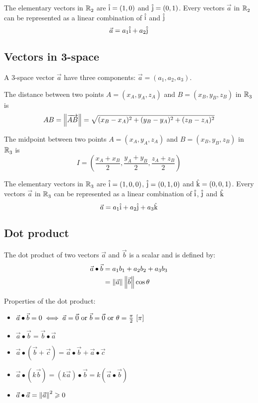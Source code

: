 \documentclass[10pt, twocolumn]{article}
\theoremstyle{remark}
\begin{document}
The elementary vectors in \(\mathbb{R}_{2}^{}\) are \(\hat{\mathrm{i}} = (1, 0)\) and \(\hat{\mathrm{j}} = (0, 1)\).
Every vectors \(\vec{a}\) in \(\mathbb{R}_{2}^{}\) can be represented as a linear combination of \(\hat{\mathrm{i}}\) and \(\hat{\mathrm{j}}\)
\[
  \vec{a} = a_1 \hat{\mathrm{i}} + a_2 \hat{\mathrm{j}}
\]

\subsection{Vectors in 3-space}
A 3-space vector \(\vec{a}\) have three components: \(\vec{a} = (a_1 , a_2 , a_3 )\).

The distance between two points \(A = (x_A , y_A , z_A )\) and \(B = (x_B , y_B , z_B )\) in \(\mathbb{R}_{3}^{}\) is
\[
  AB = \left\| \overrightarrow{AB} \right\| = \sqrt{(x_B - x_A )^2 + (y_B - y_A )^2 + (z_B - z_A )^2 }
\]

The midpoint between two points \(A = (x_A , y_A , z_A )\) and \(B = (x_B , y_B , z_B )\) in \(\mathbb{R}_{3}^{}\) is
\[
  I = \left( \frac{x_A + x_B }{2}, \frac{y_A + y_B }{2}, \frac{z_A + z_B }{2} \right)
\]

The elementary vectors in \(\mathbb{R}_{3}^{}\) are \(\hat{\mathrm{i}} = (1, 0, 0)\), \(\hat{\mathrm{j}} = (0, 1, 0)\) and \(\hat{\mathrm{k}} = (0, 0, 1)\).
Every vectors \(\vec{a}\) in \(\mathbb{R}_{3}^{}\) can be represented as a linear combination of \(\hat{\mathrm{i}}\), \(\hat{\mathrm{j}}\) and \(\hat{\mathrm{k}}\)
\[
  \vec{a} = a_1 \hat{\mathrm{i}} + a_2 \hat{\mathrm{j}} + a_3 \hat{\mathrm{k}}
\]

\subsection{Dot product}
The dot product of two vectors \(\vec{a}\) and \(\vec{b}\) is a scalar and is defined by:
\begin{align*}
  \vec{a} \bullet \vec{b} & = a_1 b_1 + a_2 b_2 + a_3 b_3    \\
                          & = \left\| \vec{a} \right\|\left\| \vec{b} \right\|\cos\theta
\end{align*}

Properties of the dot product:
\begin{itemize}
  \item \(\vec{a} \bullet \vec{b} = 0 \iff \vec{a} = \vec{0} \text{ or } \vec{b} = \vec{0} \text{ or } \theta = \frac{\pi}{2} \,\left[ \pi \right]\)
  \item \(\vec{a} \bullet \vec{b} = \vec{b} \bullet \vec{a}\)
  \item \(\vec{a} \bullet (\vec{b} + \vec{c}) = \vec{a} \bullet \vec{b} + \vec{a} \bullet \vec{c}\)
  \item \(\vec{a} \bullet (k\vec{b}) = (k\vec{a}) \bullet \vec{b} = k(\vec{a} \bullet \vec{b})\)
  \item \(\vec{a} \bullet \vec{a} = \left\| \vec{a} \right\|^2 \geqslant 0\)
\end{itemize}
\end{document}
